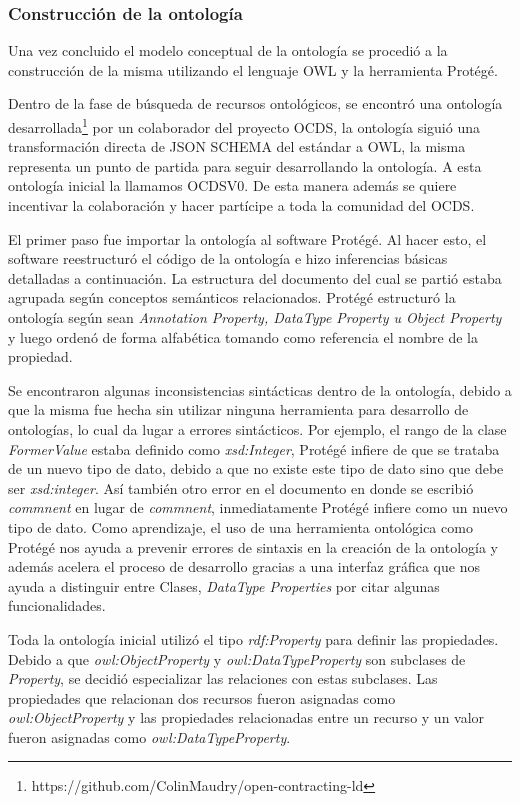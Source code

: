 \subsubsection{Construcción de la ontología}

Una vez concluido el modelo conceptual de la ontología se procedió a la construcción de la misma utilizando el lenguaje OWL y la herramienta Protégé.

Dentro de la fase de búsqueda de recursos ontológicos, se encontró una ontología desarrollada\footnote{https://github.com/ColinMaudry/open-contracting-ld} por un colaborador del proyecto OCDS, la ontología siguió una transformación directa de JSON SCHEMA del estándar a OWL, la misma representa un punto de partida para seguir desarrollando la ontología. A esta ontología inicial la llamamos OCDSV0. De esta manera además se quiere incentivar la colaboración y hacer partícipe a toda la comunidad del OCDS.

El primer paso fue importar la ontología al software Protégé. Al hacer esto, el software reestructuró el código de la ontología e hizo inferencias básicas detalladas a continuación. 
La estructura del documento del cual se partió estaba agrupada según conceptos semánticos relacionados. Protégé estructuró la ontología según sean \textit{Annotation Property, DataType Property u Object Property} y luego ordenó de forma alfabética tomando como referencia el nombre de la propiedad.

Se encontraron algunas inconsistencias sintácticas dentro de la ontología, debido a que la misma fue hecha sin utilizar ninguna herramienta para desarrollo de ontologías, lo cual da lugar a errores sintácticos. Por ejemplo, el rango de la clase \textit{FormerValue} estaba definido como \textit{xsd:Integer}, Protégé infiere de que se trataba de un nuevo tipo de dato,  debido a que no existe este tipo de dato sino que debe ser \textit{xsd:integer}. Así también otro error en el documento en donde se escribió \textit{commnent} en lugar de \textit{commnent}, inmediatamente Protégé infiere como un nuevo tipo de dato. Como aprendizaje, el uso de una herramienta ontológica como Protégé nos ayuda a prevenir errores de sintaxis en la creación de la ontología y además acelera el proceso de desarrollo gracias a una interfaz gráfica que nos ayuda a distinguir entre Clases, \textit{DataType Properties} por citar algunas funcionalidades.

Toda la ontología inicial utilizó el tipo \textit{rdf:Property} para definir las propiedades. Debido a que \textit{owl:ObjectProperty} y \textit{owl:DataTypeProperty} son subclases de \textit{Property}, se decidió especializar las relaciones con estas subclases. Las propiedades que relacionan dos recursos fueron asignadas como \textit{owl:ObjectProperty} y las propiedades relacionadas entre un recurso y un valor fueron asignadas como \textit{owl:DataTypeProperty}.

